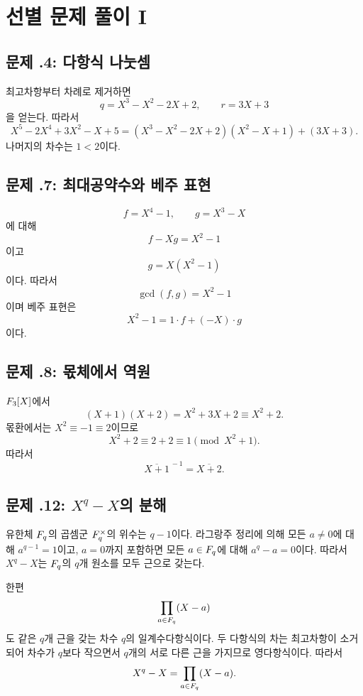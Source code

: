 \section{선별 문제 풀이 I}
\label{sec:polynomial-solutions-a}

\subsection*{문제 \thechapter.4: 다항식 나눗셈}

\begin{solution}
최고차항부터 차례로 제거하면
\[
 q=X^3-X^2-2X+2,
 \qquad r=3X+3
\]
을 얻는다. 따라서
\[
 X^5-2X^4+3X^2-X+5
 =(X^3-X^2-2X+2)(X^2-X+1)+(3X+3).
\]
나머지의 차수는 $1<2$이다.
\end{solution}

\subsection*{문제 \thechapter.7: 최대공약수와 베주 표현}

\begin{solution}
\[
 f=X^4-1,\qquad g=X^3-X
\]
에 대해
\[
 f-Xg=X^2-1
\]
이고
\[
 g=X(X^2-1)
\]
이다. 따라서
\[
 \gcd(f,g)=X^2-1
\]
이며 베주 표현은
\[
 X^2-1=1\cdot f+(-X)\cdot g
\]
이다.
\end{solution}

\subsection*{문제 \thechapter.8: 몫체에서 역원}

\begin{solution}
$F_3[X]$에서
\[
 (X+1)(X+2)=X^2+3X+2\equiv X^2+2.
\]
몫환에서는 $X^2\equiv-1\equiv2$이므로
\[
 X^2+2\equiv2+2\equiv1\pmod{X^2+1}.
\]
따라서
\[
 \overline{X+1}^{\,-1}=\overline{X+2}.
\]
\end{solution}

\subsection*{문제 \thechapter.12: $X^q-X$의 분해}

\begin{solution}
유한체 $F_q$의 곱셈군 $F_q^\times$의 위수는 $q-1$이다. 라그랑주 정리에 의해 모든 $a\ne0$에 대해 $a^{q-1}=1$이고, $a=0$까지 포함하면 모든 $a\in F_q$에 대해 $a^q-a=0$이다. 따라서 $X^q-X$는 $F_q$의 $q$개 원소를 모두 근으로 갖는다.

한편
\[
 \prod_{a\in F_q}(X-a)
\]
도 같은 $q$개 근을 갖는 차수 $q$의 일계수다항식이다. 두 다항식의 차는 최고차항이 소거되어 차수가 $q$보다 작으면서 $q$개의 서로 다른 근을 가지므로 영다항식이다. 따라서
\[
 X^q-X=\prod_{a\in F_q}(X-a).
\]
\end{solution}

